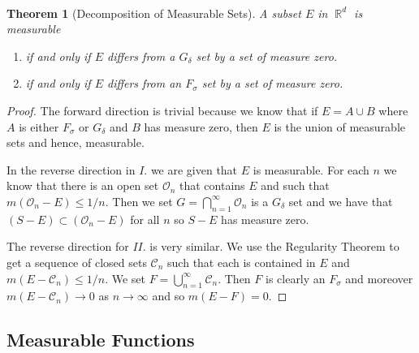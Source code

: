 \documentclass{article}
\DeclareMathOperator{\R}{\mathbb{R}}
\newtheorem*{thm}{\\ Theorem}
\begin{document}
\begin{thm}[Decomposition of Measurable Sets]
  A subset $E$ in $\R^d$ is measurable
  \begin{enumerate}
  \item[I.] if and only if $E$ differs from a $G_\delta$ set by a set of
    measure zero.
  \item[II.] if and only if $E$ differs from an $F_\sigma$ set by a set of
    measure zero.
  \end{enumerate}
\end{thm}
\begin{proof}
  The forward direction is trivial because we know that if $E = A \cup B$
  where $A$ is either $F_\sigma$ or $G_\delta$ and $B$ has measure zero, then
  $E$ is the union of measurable sets and hence, measurable.

  In the reverse direction in $I.$ we are given that $E$ is measurable. For
  each $n$ we know that there is an open set $\mathcal{O}_n$ that contains
  $E$ and such that $m(\mathcal{O}_n - E) \leq 1/n$. Then we set $G =
  \bigcap_{n=1}^\infty \mathcal{O}_n$ is a $G_\delta$ set and we have that
  $(S - E) \subset (\mathcal{O}_n - E)$ for all $n$ so $S - E$ has measure
  zero.

  The reverse direction for $II.$ is very similar. We use the Regularity
  Theorem to get a sequence of closed sets $\mathcal{C}_n$ such that each is
  contained in $E$ and $m(E - \mathcal{C}_n) \leq 1/n$. We set $F =
  \bigcup_{n=1}^\infty \mathcal{C}_n$. Then $F$ is clearly an $F_\sigma$ and
  moreover $m(E-\mathcal{C}_n) \to 0$ as $n\to \infty$ and so $m(E - F) = 0$.
\end{proof}

\subsection{Measurable Functions}
\end{document}
